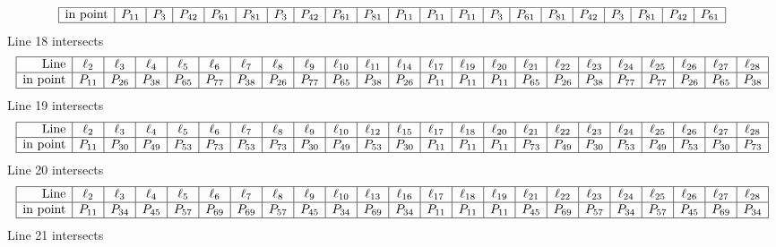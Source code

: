 \documentclass{article}
\begin{document}
{$$\begin{array}{|r*{20}{|c}|}
\hline
\mbox{in point}  & P_{11} & P_{3} & P_{42} & P_{61} & P_{81} & P_{3} & P_{42} & P_{61} & P_{81} & P_{11} & P_{11} & P_{11} & P_{3} & P_{61} & P_{81} & P_{42} & P_{3} & P_{81} & P_{42} & P_{61}\\
\hline
\end{array}
$$
Line 18 intersects 
$$
\begin{array}{|r*{22}{|c}|}
\hline
\mbox{Line}  & \ell_{2} & \ell_{3} & \ell_{4} & \ell_{5} & \ell_{6} & \ell_{7} & \ell_{8} & \ell_{9} & \ell_{10} & \ell_{11} & \ell_{14} & \ell_{17} & \ell_{19} & \ell_{20} & \ell_{21} & \ell_{22} & \ell_{23} & \ell_{24} & \ell_{25} & \ell_{26} & \ell_{27} & \ell_{28}\\
\hline
\mbox{in point}  & P_{11} & P_{26} & P_{38} & P_{65} & P_{77} & P_{38} & P_{26} & P_{77} & P_{65} & P_{38} & P_{26} & P_{11} & P_{11} & P_{11} & P_{65} & P_{26} & P_{38} & P_{77} & P_{77} & P_{26} & P_{65} & P_{38}\\
\hline
\end{array}
$$
Line 19 intersects 
$$
\begin{array}{|r*{22}{|c}|}
\hline
\mbox{Line}  & \ell_{2} & \ell_{3} & \ell_{4} & \ell_{5} & \ell_{6} & \ell_{7} & \ell_{8} & \ell_{9} & \ell_{10} & \ell_{12} & \ell_{15} & \ell_{17} & \ell_{18} & \ell_{20} & \ell_{21} & \ell_{22} & \ell_{23} & \ell_{24} & \ell_{25} & \ell_{26} & \ell_{27} & \ell_{28}\\
\hline
\mbox{in point}  & P_{11} & P_{30} & P_{49} & P_{53} & P_{73} & P_{53} & P_{73} & P_{30} & P_{49} & P_{53} & P_{30} & P_{11} & P_{11} & P_{11} & P_{73} & P_{49} & P_{30} & P_{53} & P_{49} & P_{53} & P_{30} & P_{73}\\
\hline
\end{array}
$$
Line 20 intersects 
$$
\begin{array}{|r*{22}{|c}|}
\hline
\mbox{Line}  & \ell_{2} & \ell_{3} & \ell_{4} & \ell_{5} & \ell_{6} & \ell_{7} & \ell_{8} & \ell_{9} & \ell_{10} & \ell_{13} & \ell_{16} & \ell_{17} & \ell_{18} & \ell_{19} & \ell_{21} & \ell_{22} & \ell_{23} & \ell_{24} & \ell_{25} & \ell_{26} & \ell_{27} & \ell_{28}\\
\hline
\mbox{in point}  & P_{11} & P_{34} & P_{45} & P_{57} & P_{69} & P_{69} & P_{57} & P_{45} & P_{34} & P_{69} & P_{34} & P_{11} & P_{11} & P_{11} & P_{45} & P_{69} & P_{57} & P_{34} & P_{57} & P_{45} & P_{69} & P_{34}\\
\hline
\end{array}
$$
Line 21 intersects 
$$
\begin{array}{|r*{20}{|c}|}

\end{array}$$}
\end{document}
